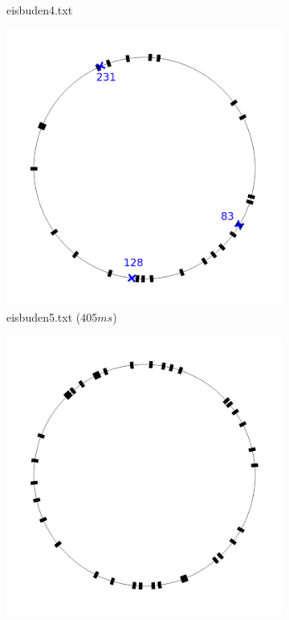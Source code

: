 \documentclass[a4paper,10pt,ngerman,captions=figureheading]{scrartcl}
\newcommand{\imageWidth}{0.3\linewidth}
\begin{document}
\begin{figure}[h!t]
\begin{subfigure}[t]{\imageWidth}
        \caption{eisbuden4.txt}
        \label{fig:eisbuden4}
    \end{subfigure}
    \begin{subfigure}[t]{\imageWidth}
        \includegraphics[width=\linewidth]{eisbuden5.png}
        \caption{eisbuden5.txt ($405ms$)}
        \label{fig:eisbuden5}
    \end{subfigure}
    \begin{subfigure}[t]{\imageWidth}
        \includegraphics[width=\linewidth]{eisbuden6.png}

\end{subfigure}
\end{figure}
\end{document}
